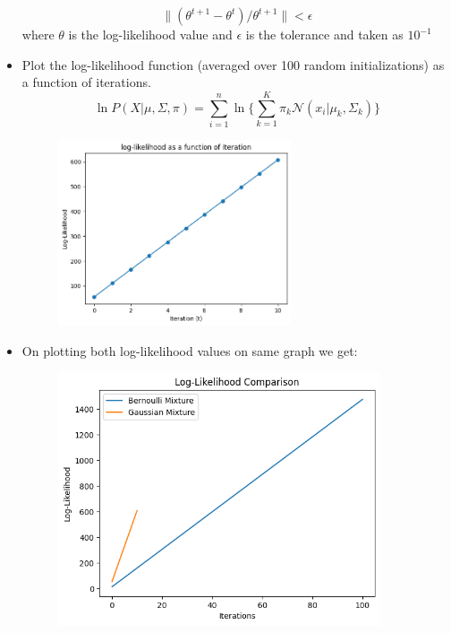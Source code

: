 \documentclass[12pt, a4paper]{article}
\begin{document}
\begin{itemize}
    \[\|(\theta^{t+1}-\theta^t)/\theta^{t+1}\|<\epsilon\]
    where $\theta$ is the log-likelihood value and $\epsilon$ is the tolerance and taken as $10^{-1}$
    \item \large Plot the log-likelihood function (averaged over 100 random initializations) as a function of iterations.
    \[\ln P(X|\mu,\varSigma,\pi)=\sum\limits_{i=1}^{n}\ln\{\sum\limits_{k=1}^{K}\pi_k\mathcal{N}(x_i|\mu_k,\varSigma_k)\}\] 
    \begin{figure}[ht]
        \centering
        \includegraphics[width=0.65\textwidth]{log-likelihood_gaussian}
        \caption{}
    \end{figure}
    \newpage
    \item \large On plotting both log-likelihood values on same graph we get:
    \begin{figure}[ht]
        \centering
        \includegraphics[width=0.90\textwidth]{log-likelihood_comp}
        \caption{}
    \end{figure}

\end{itemize}
\end{document}

